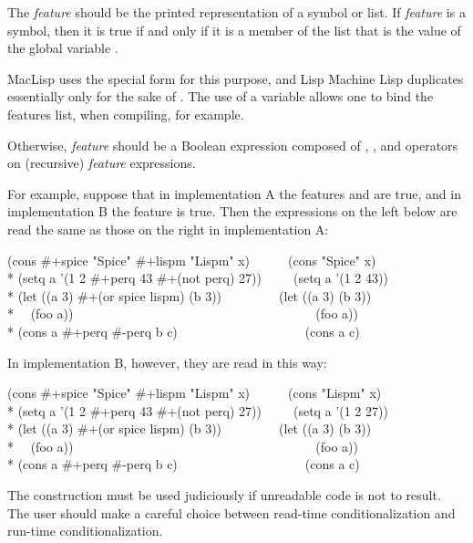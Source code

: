 \begin{flushdesc}
The {\it feature} should be the printed representation of a symbol or list.
If {\it feature} is a symbol, then 
it is true if and only if it is a member of the list that is the value of
the global variable .

\beforenoterule
\begin{incompatibility}
MacLisp uses the  special form for
this purpose, and Lisp Machine Lisp duplicates  essentially only
for the sake of .  The use of a variable allows
one to bind the features list, when compiling, for example.
\end{incompatibility}
\afternoterule

Otherwise,
{\it feature} should be a Boolean expression composed of , , and
 operators on (recursive) {\it feature} expressions.

For example, suppose that in implementation A the features  and
 are true, and in implementation B the feature  is true.
Then the expressions on the left below are read the same as those on the
right in implementation A:
\begin{lisp}
(cons \#+spice "Spice" \#+lispm "Lispm" x)~~~~~~(cons "Spice" x) \\*
(setq a '(1 2 \#+perq 43 \#+(not perq) 27))~~~~~(setq a '(1 2 43)) \\*
(let ((a 3) \#+(or spice lispm) (b 3))~~~~~~~~~(let ((a 3) (b 3)) \\*
~~(foo a))~~~~~~~~~~~~~~~~~~~~~~~~~~~~~~~~~~~~~~(foo a))\\*
(cons a \#+perq \#-perq b c)~~~~~~~~~~~~~~~~~~~~(cons a c)
\end{lisp}
In implementation B, however, they are read in this way:
\begin{lisp}
(cons \#+spice "Spice" \#+lispm "Lispm" x)~~~~~~(cons "Lispm" x) \\*
(setq a '(1 2 \#+perq 43 \#+(not perq) 27))~~~~~(setq a '(1 2 27)) \\*
(let ((a 3) \#+(or spice lispm) (b 3))~~~~~~~~~(let ((a 3) (b 3)) \\*
~~(foo a))~~~~~~~~~~~~~~~~~~~~~~~~~~~~~~~~~~~~~~(foo a))\\*
(cons a \#+perq \#-perq b c)~~~~~~~~~~~~~~~~~~~~(cons a c)
\end{lisp}

\newpage%

The \cd{\#+} construction must be used judiciously if unreadable code is
not to result.  The user should make a careful choice between read-time
conditionalization and run-time conditionalization.


\end{flushdesc}
